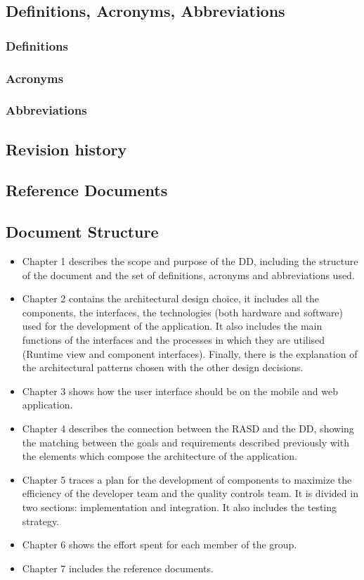 \subsection{Definitions, Acronyms, Abbreviations}
\subsubsection{Definitions}
\subsubsection{Acronyms}
\subsubsection{Abbreviations}
\subsection{Revision history}
\subsection{Reference Documents}
\subsection{Document Structure}
\begin{itemize}
	\item Chapter 1 describes the scope and purpose of the DD, including the structure of the document and the set of definitions, acronyms and abbreviations used.
	\item Chapter 2 contains the architectural design choice, it includes all the components, the interfaces, the technologies (both hardware and software) used for the development of the application. It also includes the main functions of the interfaces and the processes in which they are utilised (Runtime view and component interfaces). Finally, there is the explanation of the architectural patterns chosen with the other design decisions.
	\item Chapter 3 shows how the user interface should be on the mobile and web application.
	\item Chapter 4 describes the connection between the RASD and the DD, showing the matching between the goals and requirements described previously with the elements which compose the
architecture of the application.
	\item Chapter 5 traces a plan for the development of components to maximize the efficiency of the developer team and the quality controls team. It is divided in two sections: implementation and integration. It also includes the testing strategy.
	\item Chapter 6 shows the effort spent for each member of the group.
	\item Chapter 7 includes the reference documents.
\end{itemize}